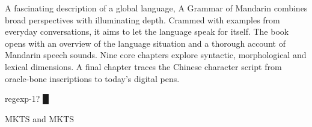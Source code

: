
A fascinating description of a global language, {\mktsStyleItalic{}A Grammar of Mandarin\/} combines broad perspectives with illuminating depth. Crammed with examples from everyday conversations, it aims to let the language speak for itself. The book opens with an overview of the language situation and a thorough account of Mandarin speech sounds. Nine core chapters explore syntactic, morphological and lexical dimensions. A final chapter traces the Chinese character script from oracle-bone inscriptions to today’s digital pens.\mktsShowpar\par
\begin{multicols}{2}






\mktsShowpar\par
{\mktsStyleBold\color{violet}{\mktsStyleSymbol}regexp-1? {\mktsStyleSymbol█}}\mktsShowpar\par
{\mktsStyleBold{}MKTS} and {\mktsStyleBold{}MKTS}
\end{multicols}
